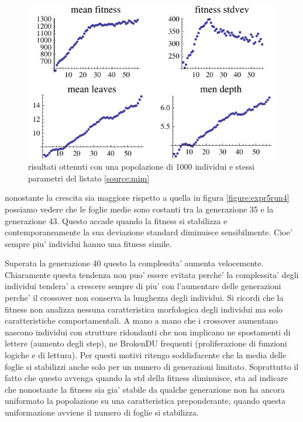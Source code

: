 \documentclass[12pt, a4paper]{article}
\begin{document}
\begin{figure}[!h]
\begin{center}
\includegraphics[width=12.0cm]{expr5_run6.pdf}
\caption{risultati ottenuti con una popolazione di 1000 individui e stessi parametri del listato \ref{source:mim}} 
\label{figure:expr5run6}
\end{center}
\end{figure}

nonostante la crescita sia maggiore rispetto a quella in figura \ref{figure:expr5run4} possiamo vedere che le foglie medie sono costanti tra la generazione 35 e la generazione 43.
Questo accade quando la fitness si stabilizza e contemporaneamente la sua deviazione standard diminuisce sensibilmente. Cioe' sempre piu' individui hanno una fitness simile.

Superata la generazione 40 questo la complessita' aumenta velocemente. Chiaramente questa tendenza non puo' essere evitata perche' la complessita' degli individui tendera' a crescere sempre di piu' con l'aumentare delle generazioni perche' il crossover non conserva la lunghezza degli individui. Si ricordi che la fitness non analizza nessuna caratteristica morfologica degli individui ma solo caratteristiche comportamentali. A mano a mano che i crossover aumentano nascono individui con strutture ridondanti che non implicano ne spostamenti di lettere (aumento degli step), ne BrokenDU frequenti (proliferazione di funzioni logiche e di lettura). Per questi motivi ritengo soddisfacente che la media delle foglie si stabilizzi anche solo per un numero di generazioni limitato. Soprattutto il fatto che questo avvenga quando la std della fitness diminuisce, sta ad indicare che nonostante la fitness sia gia' stabile da qualche generazione non ha ancora uniformato la popolazione su una caratteristica preponderante, quando questa uniformazione avviene il numero di foglie si stabilizza.
\end{document}
